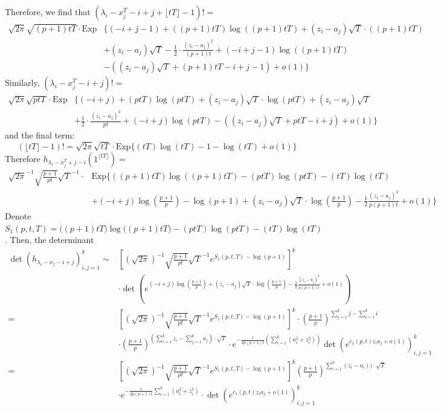 \documentclass[12pt]{article}
\begin{document}
Therefore, we find that $(\lambda_{i}-x_{j}^{T}-i+j+\lfloor tT \rfloor -1)!=$
\begin{align*}
	\sqrt{2\pi}\sqrt{(p+1)tT}\cdot \text{Exp}&\{(-i+j-1) + ((p+1)tT)\log((p+1)tT)+(z_{i}-a_{j})\sqrt{T}\cdot ((p+1)tT)\\
	&+(z_{i}-a_{j})\sqrt{T}-\frac{1}{2}\cdot\frac{(z_{i}-a_{j})^2}{(p+1)t}+(-i+j-1)\log((p+1)tT)\\&-\left((z_{i}-a_{j})\sqrt{T} + (p+1)tT-i+j-1\right)+o(1)\}
\end{align*}
Similarly, $(\lambda_{i}-x_{j}^{T}-i+j)!=$
\begin{align*}
\sqrt{2\pi}\sqrt{ptT}\cdot \text{Exp}&\{(-i+j) + (ptT)\log(ptT)+(z_{i}-a_{j})\sqrt{T}\cdot \log(ptT)+(z_{i}-a_{j})\sqrt{T}\\
& +\frac{1}{2}\cdot\frac{(z_{i}-a_{j})^2}{pt}+(-i+j)\log(ptT)-((z_{i}-a_{j})\sqrt{T} + ptT-i+j)+o(1)\}
\end{align*} and the final term: $$
(\lfloor tT \rfloor-1)!= \sqrt{2\pi}\sqrt{tT}\cdot \text{Exp}\{(tT)\log(tT)-1-\log(tT)+o(1)\}$$
Therefore $h_{\lambda_{i}-x^{T}_{j}+j-i}(1^{\lfloor tT \rfloor})=$
\begin{align*}
	\sqrt{2\pi}^{-1}\sqrt{\frac{p+1}{pt}}\sqrt{T}^{-1}\cdot &\text{Exp}\bigg\{((p+1)tT)\log((p+1)tT)-(ptT)\log(ptT)-(tT)\log(tT)\\
	& +(-i+j)\log(\frac{p+1}{p})-\log(p+1)+(z_{i}-a_{j})\sqrt{T}\cdot \log(\frac{p+1}{p})-\frac{1}{2}\frac{(z_{i}-a_{j})^{2}}{p(p+1)t}+o(1)\bigg\}
\end{align*}
Denote $S_{1}(p,t,T)=\big((p+1)tT)\log((p+1)tT\big)-(ptT)\log(ptT)-(tT)\log(tT)$. Then, the determinant 
\begin{align*} 
\det(h_{\lambda_{i}-x_{j}-i+j})_{i,j=1}^{k} \sim&\left[(\sqrt{2\pi})^{-1}\sqrt{\frac{p+1}{pt}}\sqrt{T}^{-1}e^{S_{1}(p,t,T)-\log(p+1)}\right]^{k}\\
&\cdot
	 \det\left(e^{(-i+j)\log(\frac{p+1}{p})+(z_{i}-a_{j})\sqrt{T}\cdot \log(\frac{p+1}{p})-\frac{1}{2}\frac{(z_{i}-a_{j})^2}{p(p+1)t}+o(1)}\right)\\
	=&\left[(\sqrt{2\pi})^{-1}\sqrt{\frac{p+1}{pt}}\sqrt{T}^{-1}e^{S_{1}(p,t,T)-\log(p+1)}\right]^{k}\cdot \left(\frac{p+1}{p}\right)^{\sum_{j=1}^k j-\sum_{i=1}^{k}i} \\
	 &\cdot\left(\frac{p+1}{p}\right)^{\left(\sum_{i=1}^{k}z_{i}-\sum_{j=1}^{k}a_{j}\right)\cdot\sqrt{T}} \cdot e^{-\frac{1}{2p(p+1)t}(\sum_{i=1}^{k}(a_{i}^2+z_{i}^2))}\det(e^{c_{1}(p,t)z_{i}a_{j}+o(1)})_{i,j=1}^{k}\\
	 =& \left[(\sqrt{2\pi})^{-1}\sqrt{\frac{p+1}{pt}}\sqrt{T}^{-1}e^{S_{1}(p,t,T)-\log(p+1)}\right]^{k}\left(\frac{p+1}{p}\right)^{\sum_{i=1}^{k}(z_{i}-a_{i}))\cdot\sqrt{T}} \\
	&\cdot e^{-\frac{1}{2p(p+1)t}\sum_{i=1}^{k}(a_{i}^2+z_{i}^2)}\cdot \det\left(e^{c_{1}(p,t)z_{i}a_{j}+o(1)}\right)_{i,j=1}^{k}
\end{align*}
\end{document}
